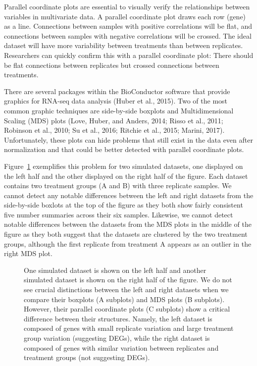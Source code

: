 \documentclass[useAMS,referee]{biom}
\begin{document}
Parallel coordinate plots are essential to visually verify the relationships between variables in multivariate data. A parallel coordinate plot draws each row (gene) as a line. Connections between samples with positive correlations will be flat, and connections between samples with negative correlations will be crossed. The ideal dataset will have more variability between treatments than between replicates. Researchers can quickly confirm this with a parallel coordinate plot: There should be flat connections between replicates but crossed connections between treatments.

There are several packages within the BioConductor software that provide graphics for RNA-seq data analysis (Huber et al., 2015). Two of the most common graphic techniques are side-by-side boxplots and Multidimensional Scaling (MDS) plots (Love, Huber, and Anders, 2014; Risso et al., 2011; Robinson et al., 2010; Su et al., 2016; Ritchie et al., 2015; Marini, 2017). Unfortunately, these plots can hide problems that still exist in the data even after normalization and that could be better detected with parallel coordinate plots.

Figure~\ref{2group} exemplifies this problem for two simulated datasets, one displayed on the left half and the other displayed on the right half of the figure. Each dataset contains two treatment groups (A and B) with three replicate samples. We cannot detect any notable differences between the left and right datasets from the side-by-side boxlots at the top of the figure as they both show fairly consistent five number summaries across their six samples. Likewise, we cannot detect notable differences between the datasets from the MDS plots in the middle of the figure as they both suggest that the datasets are clustered by the two treatment groups, although the first replicate from treatment A appears as an outlier in the right MDS plot.

\begin{figure}[t!]
\begin{center}
\centerline{}
\end{center}
\caption{One simulated dataset is shown on the left half and another simulated dataset is shown on the right half of the figure. We do not see crucial distinctions between the left and right datasets when we compare their boxplots (A subplots) and MDS plots (B subplots). However, their parallel coordinate plots (C subplots) show a critical difference between their structures. Namely, the left dataset is composed of genes with small replicate variation and large treatment group variation (suggesting DEGs), while the right dataset is composed of genes with similar variation between replicates and treatment groups (not suggesting DEGs). 
\label{2group}}
\end{figure}
\end{document}
